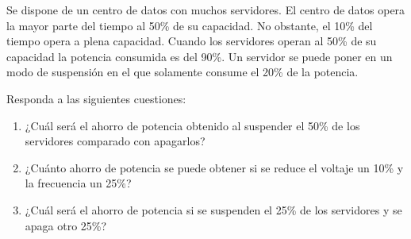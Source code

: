 \begin{acexercise}\end{acexercise}

Se dispone de un centro de datos con muchos servidores. El centro de datos opera
la mayor parte del tiempo al 50\% de su capacidad. No obstante, el 10\% del tiempo
opera a plena capacidad. Cuando los servidores operan al 50\% de su capacidad la
potencia consumida es del 90\%. Un servidor se puede poner en un modo de suspensión
en el que solamente consume el 20\% de la potencia.

Responda a las siguientes cuestiones:

\begin{enumerate}

\item ¿Cuál será el ahorro de potencia obtenido al suspender el 50\% de los
servidores comparado con apagarlos?

\item ¿Cuánto ahorro de potencia se puede obtener si se reduce el voltaje un
10\% y la frecuencia un 25\%?

\item ¿Cuál será el ahorro de potencia si se suspenden el 25\% de los servidores
y se apaga otro 25\%?

\end{enumerate}


\begin{acsolution}\end{acsolution}


